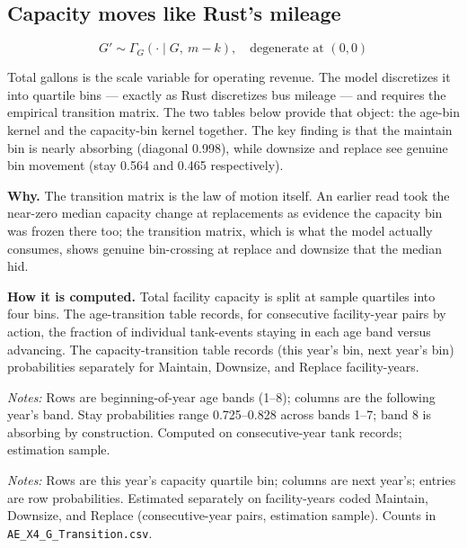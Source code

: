 \documentclass[
  letterpaper,
  DIV=11,
  numbers=noendperiod]{scrartcl}
\begin{document}
\subsection{Capacity moves like Rust's mileage}\label{sec-ae-x4}

\[
G' \sim \Gamma_G(\cdot \mid G,\ m - k), \quad \text{degenerate at } (0,0)
\]

Total gallons is the scale variable for operating revenue. The model
discretizes it into quartile bins --- exactly as Rust discretizes bus
mileage --- and requires the empirical transition matrix. The two tables
below provide that object: the age-bin kernel and the capacity-bin
kernel together. The key finding is that the maintain bin is nearly
absorbing (diagonal 0.998), while downsize and replace see genuine bin
movement (stay 0.564 and 0.465 respectively).

\textbf{Why.} The transition matrix is the law of motion itself. An
earlier read took the near-zero median capacity change at replacements
as evidence the capacity bin was frozen there too; the transition
matrix, which is what the model actually consumes, shows genuine
bin-crossing at replace and downsize that the median hid.

\textbf{How it is computed.} Total facility capacity is split at sample
quartiles into four bins. The age-transition table records, for
consecutive facility-year pairs by action, the fraction of individual
tank-events staying in each age band versus advancing. The
capacity-transition table records (this year's bin, next year's bin)
probabilities separately for Maintain, Downsize, and Replace
facility-years.

\begin{table}[H]
\centering
\caption{Age-bin transition kernel by action}

\par\vspace{4pt}
{\footnotesize\textit{Notes:} Rows are beginning-of-year age bands (1--8);
columns are the following year's band. Stay probabilities range 0.725--0.828
across bands 1--7; band 8 is absorbing by construction. Computed on
consecutive-year tank records; estimation sample.\par}
\end{table}

\begin{table}[H]
\centering
\caption{Capacity-bin transition matrix by action}

\par\vspace{4pt}
{\footnotesize\textit{Notes:} Rows are this year's capacity quartile bin;
columns are next year's; entries are row probabilities. Estimated separately
on facility-years coded Maintain, Downsize, and Replace (consecutive-year pairs,
estimation sample). Counts in \texttt{AE\_X4\_G\_Transition.csv}.\par}
\end{table}
\end{document}
